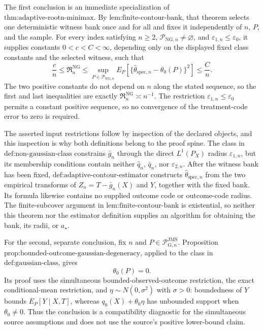 The first conclusion is an immediate specialization of \(\text{thm:adaptive-rootn-minimax}\).  By \(\text{lem:finite-contour-bank}\), that theorem selects one deterministic witness bank once and for all and fixes it independently of \(n\), \(P\), and the sample.  For every index satisfying \(n\ge2\), \(\mathcal P_{\mathrm{NG},n}\neq\varnothing\), and \(\varepsilon_{1,n}\le\varepsilon_0\), it supplies constants \(0<c<C<\infty\), depending only on the displayed fixed class constants and the selected witness, such that
\[
 \frac{c}{n}
 \le \mathfrak R_n^{\mathrm{NG}}
 \le \sup_{P\in\mathcal P_{\mathrm{NG},n}}
 E_P\!\left[
   \{\widehat\theta_{\mathrm{spec},n}-\theta_0(P)\}^{2}
 \right]
 \le \frac{C}{n}.
\]
The two positive constants do not depend on \(n\) along the stated sequence, so the first and last inequalities are exactly \(\mathfrak R_n^{\mathrm{NG}}\asymp n^{-1}\).  The restriction \(\varepsilon_{1,n}\le\varepsilon_0\) permits a constant positive sequence, so no convergence of the treatment-code error to zero is required.

The asserted input restrictions follow by inspection of the declared objects, and this inspection is why both definitions belong to the proof spine.  The class in \(\text{def:non-gaussian-class}\) constrains \(\bar g_n\) through the direct \(L^1(P_X)\) radius \(\varepsilon_{1,n}\), but its membership conditions contain neither \(\widehat q_n\), \(\bar q_n\), nor \(\varepsilon_{2,n}\).  After the witness bank has been fixed, \(\text{def:adaptive-contour-estimator}\) constructs \(\widehat\theta_{\mathrm{spec},n}\) from the two empirical transforms of \(Z_n=T-\bar g_n(X)\) and \(Y\), together with the fixed bank.  Its formula likewise contains no supplied outcome code or outcome-code radius.  The finite-subcover argument in \(\text{lem:finite-contour-bank}\) is existential, so neither this theorem nor the estimator definition supplies an algorithm for obtaining the bank, its radii, or \(a_{\star}\).

For the second, separate conclusion, fix \(n\) and \(P\in\mathcal P_{\mathrm G,n}^{\mathrm{JMS}}\).  Proposition \(\text{prop:bounded-outcome-gaussian-degeneracy}\), applied to the class in \(\text{def:gaussian-class}\), gives
\[
 \theta_0(P)=0.
\]
Its proof uses the simultaneous bounded-observed-outcome restriction, the exact conditional-mean restriction, and \(\eta\sim N(0,\sigma^2)\) with \(\sigma>0\): boundedness of \(Y\) bounds \(E_P[Y\mid X,T]\), whereas \(q_0(X)+\theta_0\eta\) has unbounded support when \(\theta_0\neq0\).  Thus the conclusion is a compatibility diagnostic for the simultaneous source assumptions and does not use the source's positive lower-bound claim.

